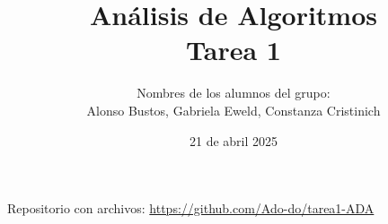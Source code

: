 \documentclass{style}
\begin{document}
\title{Análisis de Algoritmos \\ Tarea 1}
\date{21 de abril 2025}
\author{Nombres de los alumnos del grupo:\\Alonso Bustos, Gabriela Eweld, Constanza Cristinich}
\maketitle

Repositorio con archivos: \url{https://github.com/Ado-do/tarea1-ADA}






\end{document}
